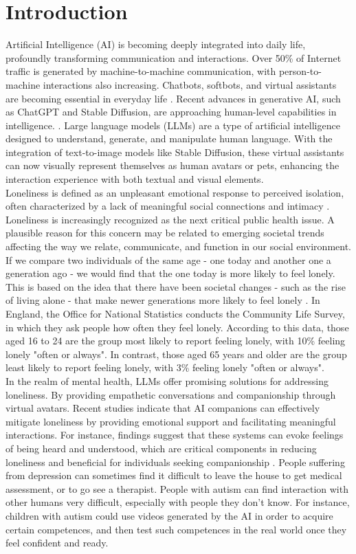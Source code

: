 \section{Introduction}
Artificial Intelligence (AI) is becoming deeply integrated into daily life, profoundly transforming communication and interactions. Over 50\% of Internet traffic is generated by machine-to-machine communication, with person-to-machine interactions also increasing. Chatbots, softbots, and virtual assistants are becoming essential in everyday life \cite{elliott2019culture}. Recent advances in generative AI, such as ChatGPT and Stable Diffusion, are approaching human-level capabilities in intelligence. \cite{orru2023human}. Large language models (LLMs) are a type of artificial intelligence designed to understand, generate, and manipulate human language. With the integration of text-to-image models like Stable Diffusion, these virtual assistants can now visually represent themselves as human avatars or pets, enhancing the interaction experience with both textual and visual elements. \\
Loneliness is defined as an unpleasant emotional response to perceived isolation, often characterized by a lack of meaningful social connections and intimacy \cite{lonelinessWiki}. Loneliness is increasingly recognized as the next critical public health issue. A plausible reason for this concern may be related to emerging societal trends affecting the way we relate, communicate, and function in our social environment. If we compare two individuals of the same age - one today and another one a generation ago - we would find that the one today is more likely to feel lonely. This is based on the idea that there have been societal changes - such as the rise of living alone - that make newer generations more likely to feel lonely \cite{owid-loneliness-epidemic}. In England, the Office for National Statistics conducts the Community Life Survey, in which they ask people how often they feel lonely. According to this data, those aged 16 to 24 are the group most likely to report feeling lonely, with 10\% feeling lonely "often or always". In contrast, those aged 65 years and older are the group least likely to report feeling lonely, with 3\% feeling lonely "often or always". \\
In the realm of mental health, LLMs offer promising solutions for addressing loneliness. By providing empathetic conversations and companionship through virtual avatars. Recent studies indicate that AI companions can effectively mitigate loneliness by providing emotional support and facilitating meaningful interactions. For instance, findings suggest that these systems can evoke feelings of being heard and understood, which are critical components in reducing loneliness \cite{strohmann2023toward} and beneficial for individuals seeking companionship \cite{odekerken2020mitigating}. People suffering from depression can sometimes find it difficult to leave the house to get medical assessment, or to go see a therapist. People with autism can find interaction with other humans very difficult, especially with people they don't know. For instance, children with autism could use videos generated by the AI in order to acquire certain competences, and then test such competences in the real world once they feel confident and ready.
